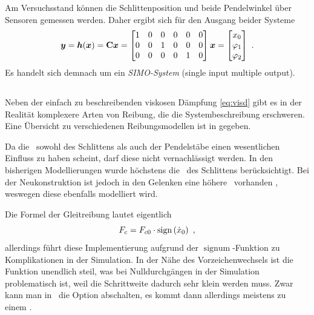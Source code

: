 Am Versuchsstand können die Schlittenposition und beide Pendelwinkel über Sensoren gemessen werden. Daher ergibt sich für den Ausgang beider Systeme
\begin{align}
	\boldsymbol{y} = \boldsymbol{h}(\boldsymbol{x})
	= {\boldsymbol{\mathrm{C}}} \boldsymbol{x}
	= \begin{bmatrix}
		1 & 0 & 0 & 0 & 0 & 0 \\
		0 & 0 & 1 & 0 & 0 & 0 \\
		0 & 0 & 0 & 0 & 1 & 0 
	\end{bmatrix} \boldsymbol{x}
	= \begin{bmatrix}
		x_0 \\ \varphi_1 \\ \varphi_2
	\end{bmatrix}  \ .
	\label{eq:hx}
\end{align}
Es handelt sich demnach um ein \emph{SIMO-System} (single input multiple output). 


\subsection{\crb}\label{sec:crb}

Neben der einfach zu beschreibenden viskosen Dämpfung \eqref{eq:visd} gibt es in der Realität komplexere Arten von Reibung, die die Systembeschreibung erschweren. 
Eine Übersicht zu verschiedenen Reibungsmodellen ist in \cite{ribeiro} gegeben.

Da die \crb\ sowohl des Schlittens als auch der Pendelstäbe einen wesentlichen Einfluss zu haben scheint, darf diese nicht vernachlässigt werden. 
In den bisherigen Modellierungen wurde höchstens die \crb\ des Schlittens berücksichtigt. 
Bei der Neukonstruktion ist jedoch in den Gelenken eine höhere \crb\ vorhanden , weswegen diese ebenfalls modelliert wird.

Die Formel der Gleitreibung lautet eigentlich 
	\[
	F_c = F_{c0}  \cdot  \mathrm{sign}\left(\dot{x}_0\right) \ ,
\]
allerdings führt diese Implementierung aufgrund der $\operatorname{signum}$-Funktion  zu Komplikationen in der Simulation.
In der Nähe des Vorzeichenwechsels ist die Funktion unendlich steil, was bei Nulldurchgängen in der Simulation problematisch ist, weil die Schrittweite dadurch sehr klein werden muss.
Zwar kann man in \sm\ die Option  abschalten, es kommt dann allerdings meistens zu einem . 
\cite{modsim}


